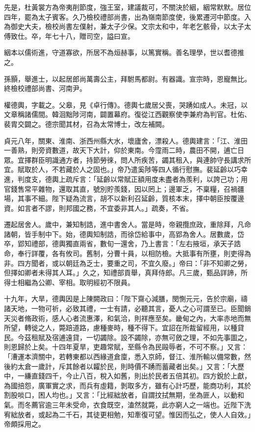 \begin{pinyinscope}
 先是，杜黃裳方為帝夷削節度，強王室，建議裁可，不關決於絪，絪常默默。居位四年，罷為太子賓客。久乃檢校禮部尚書，出為嶺南節度使，後累遷河中節度。入為御史大夫，檢校尚書左僕射，兼太子少保。文宗太和中，年老乞骸骨，以太子太傅致仕。卒，年七十八，贈司空，謚曰宣。



 絪本以儒術進，守道寡欲，所居不為烜赫事，以篤實稱。善名理學，世以耆德推之。



 孫顥，舉進士，以起居郎尚萬壽公主，拜駙馬都尉。有器識。宣宗時，恩寵無比。終檢校禮部尚書、河南尹。



 權德輿，字載之。父皋，見《卓行傳》。德輿七歲居父喪，哭踴如成人。未冠，以文章稱諸儒間。韓洄黜陟河南，闢置幕府。復從江西觀察使李兼府為判官。杜佑、裴胄交闢之。德宗聞其材，召為太常博士，改左補闕。



 貞元八年，關東、淮南、浙西州縣大水，壞廬舍，漂殺人。德輿建言：「江、淮田一善熟，則旁資數道，故天下大計，仰於東南。今霪雨二時，農田不開，逋亡日眾。宜擇群臣明識通方者，持節勞徠，問人所疾苦，蠲其租入，與連帥守長講求所宜。賦取於人，不若藏於人之固也。」帝乃遣奚陟等四人循行慰撫。裴延齡以巧幸進，判度支，德輿上疏斥言：「延齡以常賦正額用度未盡者為羨利，以誇己功；用官錢售常平雜物，還取其直，號別貯羨錢，因以罔上；邊軍乏，不稟糧，召禍疆場，其事不細。陛下疑為流言，胡不以新利召延齡，質核本末，擇中朝臣按覆邊資。如言者不謬，則邦國之務，不宜委非其人。」疏奏，不省。



 遷起居舍人。歲中，兼知制誥，進中書舍人。當是時，帝親攬庶政，重除拜，凡命諸朝，皆手制中下。始，德輿知制誥，而徐岱給事中，高郢為舍人。居數歲，岱卒，郢知禮部，德輿獨直兩省，數旬一還舍，乃上書言：「左右掖垣，承天子誥命，奉行詳覆，各有攸司。舊制，分曹十員，以相防檢。大抵事有所壅，則吏得為非。四方聞者，或以朝廷為乏士，要重之司，不宜久廢。」帝曰：「非不知卿之勞，但擇如卿者未得其人耳。」久之，知禮部貢舉，真拜侍郎。凡三歲，甄品詳諦，所得士相繼為公卿、宰相。取明經初不限員。



 十九年，大旱，德輿因是上陳闕政曰：「陛下齋心減膳，閔惻元元，告於宗廟，禱諸天地，一物可祈，必致其禮，一士有請，必聽其言，憂人之心可謂至已。臣聞銷天災者脩政術，感人心者流惠澤，和氣洽，則祥應至矣。畿甸之內，大率赤地而無所望，轉徙之人，斃踣道路，慮種麥時，種不得下。宜詔在所裁留經用，以種貸民。今茲租賦及宿逋遠貸，一切蠲除。設不蠲除，亦無可斂之理，不如先事圖之，則恩歸於上矣。十四年夏旱，吏趣常賦，至縣令為民毆辱者，不可不察。」又言：「漕運本濟關中，若轉東都以西緣道倉廩，悉入京師，督江、淮所輸以備常數，然後約太倉一歲計，斥其餘者以糶於民，則時價不踴而蓄藏者出矣。」又言：「大歷中，一縑直錢四千，今止八百，稅入如舊，則出於民者五倍其初。四方銳於上獻，為國掊怨，廣軍實之求，而兵有虛籍，剝取多方，雖有心計巧歷，能商功利，其於割股啖口，困人均也。」又言：「比經絀放者，自謂抆拭無期，坐為匪人，以動和氣。而冬薦官逾三年未受命，衣食既空，溘然就斃，此亦窮人之一端也。近陛下洗宥絀放者，或起為二千石，其徒更相勉，知牽復可望。惟因而弘之，使人人自效。」帝頗採用之。




\end{pinyinscope}
